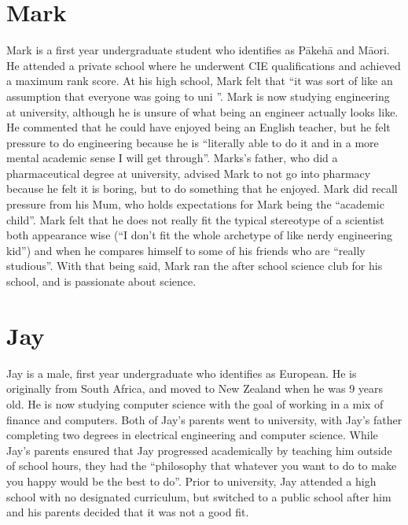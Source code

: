 \section{Mark}
Mark is a first year undergraduate student who identifies as P\={a}keh\={a} and M\={a}ori. He attended a private school where he underwent CIE qualifications and achieved a maximum rank score. At his high school, Mark felt that ``it was sort of like an assumption that everyone was going to uni ''. Mark is now studying engineering at university, although he is unsure of what being an engineer actually looks like. He commented that he could have enjoyed being an English teacher, but he felt pressure to do engineering because he is ``literally able to do it and in a more mental academic sense I will get through''. Marks's father, who did a pharmaceutical degree at university, advised Mark to not go into pharmacy because he felt it is boring, but to do something that he enjoyed. Mark did recall pressure from his Mum, who holds expectations for Mark being the ``academic child''. Mark felt that he does not really fit the typical stereotype of a scientist both appearance wise (``I don’t fit the whole archetype of like nerdy engineering kid'') and when he compares himself to some of his friends who are ``really studious''. With that being said, Mark ran the after school science club for his school, and is passionate about science. 


\section{Jay}
Jay is a male, first year undergraduate who identifies as European. He is originally from South Africa, and moved to New Zealand when he was 9 years old. He is now studying computer science with the goal of working in a mix of finance and computers. Both of Jay's parents went to university, with Jay's father completing two degrees in electrical engineering and computer science. While Jay's parents ensured that Jay progressed academically by teaching him outside of school hours, they had the ``philosophy that whatever you want to do to make you happy would be the best to do''. Prior to university, Jay attended a high school with no designated curriculum, but switched to a public school after him and his parents decided that it was not a good fit. 

